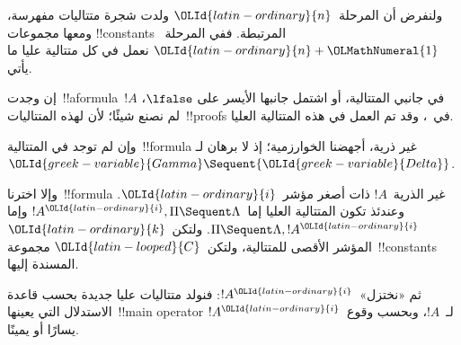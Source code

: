 \documentclass[../../../include/open-logic-section]{subfiles}
\begin{document}
ولنفرض أن المرحلة~${\OLId{latin-ordinary}{n}}$ ولدت شجرة متتاليات مفهرسة، ومعها مجموعات
!!{constant}s المرتبطة. ففي المرحلة~${\OLId{latin-ordinary}{n}}+{\OLMathNumeral{1}}$ نعمل في كل متتالية عليا ما يأتي.

إن وجدت~!!a{formula}~$!A$ في جانبي المتتالية، أو اشتمل جانبها الأيسر على
$\lfalse$، لم نصنع شيئًا؛ لأن لهذه المتتاليات~!!{proof}s في~،
وقد تم العمل في هذه المتتالية العليا.

وإن لم توجد في المتتالية~!!{formula} غير ذرية، أجهضنا الخوارزمية؛ إذ لا
برهان لـ~${\OLId{greek-variable}{Gamma}}\Sequent{\OLId{greek-variable}{Delta}}$.

وإلا اخترنا~!!{formula} غير الذرية~$!A$ ذات أصغر مؤشر~${\OLId{latin-ordinary}{i}}$. وعندئذ تكون
المتتالية العليا إما~$!A^{\OLId{latin-ordinary}{i}},\Pi\Sequent\Lambda$ وإما
$\Pi\Sequent\Lambda,!A^{\OLId{latin-ordinary}{i}}$. ولتكن~${\OLId{latin-ordinary}{k}}$ المؤشر الأقصى للمتتالية، ولتكن~${\OLId{latin-looped}{C}}$
مجموعة~!!{constant}s المسندة إليها.

ثم «نختزل»~$!A^{\OLId{latin-ordinary}{i}}$: فنولد متتاليات عليا جديدة بحسب قاعدة الاستدلال التي
يعينها~!!{main operator} لـ~$!A$، وبحسب وقوع~$!A^{\OLId{latin-ordinary}{i}}$ يسارًا أو يمينًا.
\end{document}
